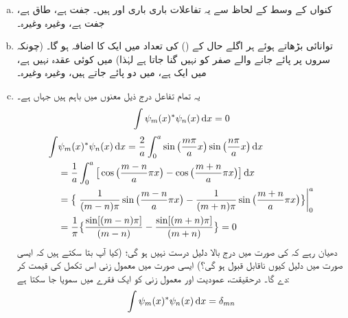 \begin{enumerate}[a.]
\item
 کنواں کے وسط کے لحاظ سے یہ تفاعلات باری باری  اور  ہیں۔   جفت ہے،   طاق ہے،  جفت ہے، وغیرہ وغیرہ۔
\item
توانائی بڑھاتے ہوئے ہر اگلے حال کے  () کی تعداد میں ایک  کا اضافہ ہو گا۔ (چونکہ سروں پر پائے جانے والے  صفر کو نہیں گنا جاتا ہے لہٰذا)  میں کوئی عقدہ نہیں  ہے،  میں ایک  ہے،  میں دو   پائے جاتے  ہیں، وغیرہ وغیرہ۔
\item
 یہ تمام تفاعل درج ذیل  معنوں میں  باہم   ہیں جہاں   ہے۔
\begin{align}
\int\psi_{m}(x)^*\psi_{n}(x)\dif{x}=0
\end{align}
\quad
\begin{align*}
\int&\psi_{m}(x)^*\psi_{n}(x)\dif{x}=\frac{2}{a}\int_{0}^{a}\sin\big(\frac{m\pi}{a}x\big)\sin\big(\frac{n\pi}{a}x\big)\dif{x}\\
&=\frac{1}{a}\int_{0}^{a}\big[\cos\big(\frac{m-n}{a}\pi x\big)-\cos\big(\frac{m+n}{a}\pi x\big)\big]\dif{x}\\
&=\big\{\left.\frac{1}{(m-n)\pi}\sin\big(\frac{m-n}{a}\pi x\big)-\frac{1}{(m+n)\pi}\sin\big(\frac{m+n}{a}\pi x\big)\big\}\right\vert_{0}^{a}\\
&=\frac{1}{\pi}\big\{\frac{\sin[(m-n)\pi]}{(m-n)}-\frac{\sin[(m+n)\pi]}{(m+n)}\big\}=0
\end{align*} 
دھیان رہے کہ  کی صورت میں درج بالا دلیل درست نہیں ہو گی؛ (کیا آپ بتا سکتے ہیں کہ ایسی صورت میں دلیل کیوں ناقابل قبول ہو گی؟) ایسی صورت میں معمول زنی   اس   تکمل کی قیمت  کر دے گا۔ درحقیقت، عمودیت اور معمول زنی کو ایک فقرے میں سمویا جا سکتا ہے:
\begin{align}
\int\psi_{m}(x)^*\psi_{n}(x)\dif{x}=\delta_{mn}
\end{align}

\end{enumerate}

